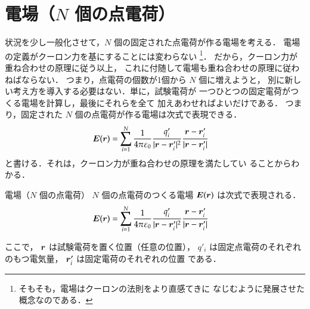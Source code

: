             \section{電場（$N$ 個の点電荷）}
            状況を少し一般化させて，$N$ 個の固定された点電荷が作る電場を考える．
            電場の定義がクーロン力を基にすることには変わらない
                \footnote{
                    そもそも，電場はクーロンの法則をより直感てきに
                    なじむように発展させた概念なのである．
                }．
            だから，クーロン力が重ね合わせの原理に従う以上，
            これに付随して電場も重ね合わせの原理に従わねばならない．
            つまり，点電荷の個数が1個から $N$ 個に増えようと，
            別に新しい考え方を導入する必要はない．単に，試験電荷が
            一つひとつの固定電荷がつくる電場を計算し，最後にそれらを全て
            加えあわせればよいだけである．
            つまり，固定された $N$ 個の点電荷が作る電場は次式で表現できる．
                \begin{align}
                    \boldsymbol{E}(\boldsymbol{r})&=\sum_{i=1}^{N}\frac{1}{4\pi\varepsilon_{0}}
                    \frac{q'_{i}}{|\boldsymbol{r}-\boldsymbol{r}'_{i}|^{2}}
                    \frac{\boldsymbol{r}-\boldsymbol{r}'_{i}}
                         {|\boldsymbol{r}-\boldsymbol{r}'_{i}|}
                \end{align}
            と書ける．それは，クーロン力が重ね合わせの原理を満たしてい
            ることからわかる．
                \begin{myshadebox}{電場（$N$ 個の点電荷）}
                    $N$ 個の点電荷のつくる電場 $\boldsymbol{E}(\boldsymbol{r})$ は次式で表現される．
                    \begin{align}\label{denba_huku}
                        \bE(\br)&=\sum_{i=1}^{N}\frac{1}{4\pi\varepsilon_{0}}
                        \frac{q'_{i}}{|\br-\br'_{i}|^{2}}
                        \frac{\br-\br'_{i}}
                             {|\br-\br'_{i}|}
                    \end{align}

                    ここで，
                        $\boldsymbol{r}$ は試験電荷を置く位置（任意の位置），
                        $q'_{i}$ は固定点電荷のそれぞれのもつ電気量，
                        $\boldsymbol{r}'_{i}$ は固定電荷のそれぞれの位置
                    である．
                \end{myshadebox}

